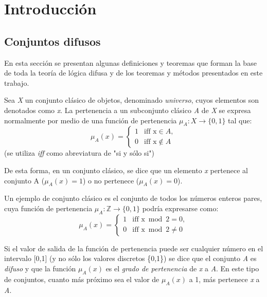 \chapter{Introducción}
\label{cha:introduccion}
\section{Conjuntos difusos}
En esta sección se presentan algunas definiciones y teoremas que forman la base de toda la teoría de lógica difusa y de los teoremas y métodos presentados en este trabajo.

\begin{definition}
Sea \emph{X} un conjunto clásico de objetos, denominado \emph{universo}, cuyos elementos son denotados como \emph{x}. La pertenencia a un subconjunto clásico \emph{A} de \emph{X} se expresa normalmente por medio de una función de pertenencia $\mu_{A}:X\rightarrow\{0,1\}$ tal que:
\begin{equation}
\mu_{A}(x)=\begin{cases} 1 & \mbox{iff } \mbox{x}\in A, \\ 0 & \mbox{iff } \mbox{x}\notin A \end{cases}
\end{equation}
(se utiliza \emph{iff} como abreviatura de "si y sólo si")
\end{definition}

De esta forma, en un conjunto clásico, se dice que un elemento \emph{x} pertenece al conjunto A ($\mu_{A}(x)=1$) o no pertenece ($\mu_{A}(x)=0$). 
\begin{example}
\normalfont
Un ejemplo de conjunto clásico es el conjunto de todos los números enteros pares, cuya función de pertenencia $\mu_{A}:\mathbb{Z}\rightarrow\{0,1\}$ podría expresarse como:
\begin{equation}
\mu_{A}(x)=\begin{cases} 1 & \mbox{iff } \mbox{x}\bmod 2=0, \\ 0 & \mbox{iff } \mbox{x}\bmod 2\ne 0 \end{cases}
\end{equation}
\end{example}
Si el valor de salida de la función de pertenencia puede ser cualquier número en el intervalo [0,1] (y no sólo los valores discretos \{0,1\}) se dice que el conjunto \emph{A} es \emph{difuso} y que la función $\mu_{A}(x)$ es el \emph{grado de pertenencia} de \emph{x} a \emph{A}. En este tipo de conjuntos, cuanto más próximo sea el valor de $\mu_{A}(x)$ a 1, más pertenece \emph{x} a \emph{A}.

